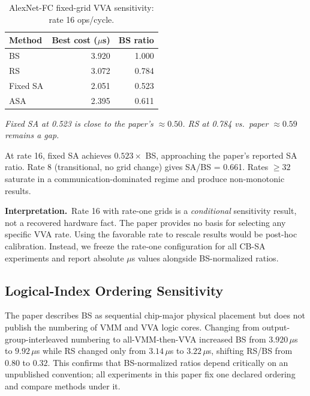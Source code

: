 \documentclass[10pt,conference]{IEEEtran}
\begin{document}
\begin{table}[htbp]
  \caption{AlexNet-FC fixed-grid VVA sensitivity: rate 16 ops/cycle.}
  \label{tab:vva}
  \centering
  \begin{tabular}{lrr}
    \toprule
    Method & Best cost ($\mu$s) & BS ratio \\
    \midrule
    BS              & 3.920  & 1.000 \\
    RS              & 3.072  & 0.784 \\
    Fixed SA        & 2.051  & 0.523 \\
    ASA             & 2.395  & 0.611 \\
    \bottomrule
  \end{tabular}
  \vspace{0.5ex}
  \small{\textit{Fixed SA at 0.523 is close to the paper's ${\approx}0.50$.
  RS at 0.784 vs.\ paper ${\approx}0.59$ remains a gap.}}
\end{table}

At rate 16, fixed SA achieves $0.523 \times$ BS, approaching the paper's
reported SA ratio.  Rate 8 (transitional, no grid change) gives SA/BS = 0.661.
Rates $\geq 32$ saturate in a communication-dominated regime and produce
non-monotonic results.

\textbf{Interpretation.}\
Rate 16 with rate-one grids is a \emph{conditional} sensitivity result, not a
recovered hardware fact.  The paper provides no basis for selecting any specific
VVA rate.  Using the favorable rate to rescale results would be post-hoc
calibration.  Instead, we freeze the rate-one configuration for all CB-SA
experiments and report absolute $\mu$s values alongside BS-normalized ratios.

\subsection{Logical-Index Ordering Sensitivity}

The paper describes BS as sequential chip-major physical placement but does not
publish the numbering of VMM and VVA logic cores.  Changing from
output-group-interleaved numbering to all-VMM-then-VVA increased BS from
$3.920\,\mu$s to $9.92\,\mu$s while RS changed only from $3.14\,\mu$s to
$3.22\,\mu$s, shifting RS/BS from $0.80$ to $0.32$.  This confirms that
BS-normalized ratios depend critically on an unpublished convention; all
experiments in this paper fix one declared ordering and compare methods under
it.

\end{document}
